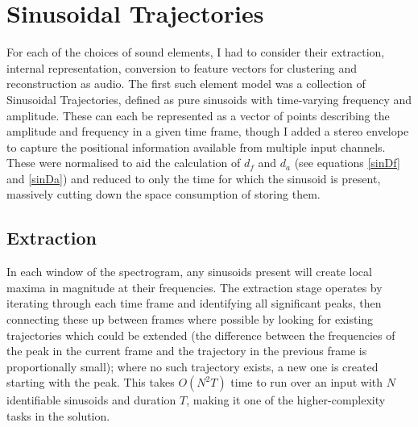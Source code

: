 \documentclass[12pt,a4paper,twoside,openright]{report}
\begin{document}

\section{Sinusoidal Trajectories}

{\color{red}For each of the choices of sound elements, I had to consider their extraction, internal representation, conversion to feature vectors for clustering and reconstruction as audio. The first such element model was a collection of Sinusoidal Trajectories, defined as pure sinusoids with time-varying frequency and amplitude. These can each be represented as a vector of points describing the amplitude and frequency in a given time frame, though I added a stereo envelope to capture the positional information available from multiple input channels. These were normalised to aid the calculation of $ d_f $ and $ d_a $ (see equations \ref{sinDf} and \ref{sinDa}) and reduced to only the time for which the sinusoid is present, massively cutting down the space consumption of storing them.



\subsection{Extraction}

In each window of the spectrogram, any sinusoids present will create local maxima in magnitude at their frequencies. The extraction stage operates by iterating through each time frame and identifying all significant peaks, then connecting these up between frames where possible by looking for existing trajectories which could be extended (the difference between the frequencies of the peak in the current frame and the trajectory in the previous frame is proportionally small); where no such trajectory exists, a new one is created starting with the peak. This takes $ O(N^2T) $ time to run over an input with $ N $ identifiable sinusoids and duration $ T $, making it one of the higher-complexity tasks in the solution.

}
\end{document}
